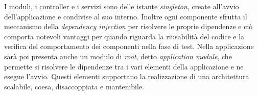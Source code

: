 I moduli, i controller e i servizi sono delle istante \textit{singleton}, create
all'avvio dell'applicazione e condivise al suo interno. Inoltre ogni componente sfrutta il meccanismo
della \textit{dependency injection} per risolvere le proprie dipendenze e ciò comporta
notevoli vantaggi per quando riguarda la riusabilità del codice e la verifica del comportamento dei componenti
nella fase di test.
Nella applicazione sarà poi presenta anche un modulo di \textit{root}, detto \textit{application module}, che 
permette si risolvere le dipendenze tra i vari elementi della applicazione e ne esegue l'avvio.
Questi elementi supportano la realizzazione di una architettura scalabile, coesa, disaccoppiata e mantenibile.